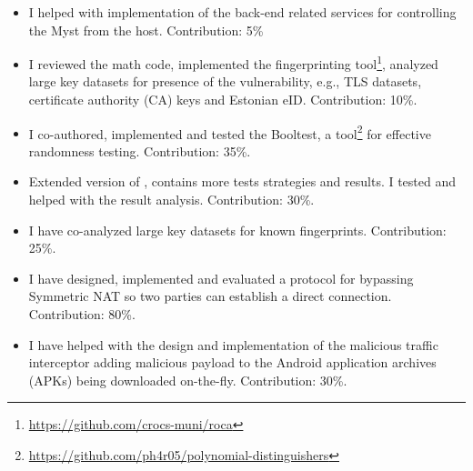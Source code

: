 \documentclass[
  digital, %
  twoside, %
  table,   %
  lof,     %
  lot,     %
]{fithesis3}
\newcounter{ph4_show_guides}
\theoremstyle{definition}
\theoremstyle{remark}
\begin{document}
\begin{itemize}
	\item {}
	I helped with implementation of the back-end related services for controlling the Myst from the host. Contribution: 5\%
	
	\item {}
	I reviewed the math code, implemented the fingerprinting tool\footnote{\url{https://github.com/crocs-muni/roca}}, analyzed large key datasets for presence of the vulnerability, e.g., TLS datasets, certificate authority (CA) keys and Estonian eID. Contribution: 10\%.
	
	\item {}
	I co-authored, implemented and tested the Booltest, a tool\footnote{\url{https://github.com/ph4r05/polynomial-distinguishers}} for effective randomness testing. Contribution: 35\%.
	
	\item {}
	Extended version of \cite{booltest_secrypt2017}, contains more tests strategies and results. I tested and helped with the result analysis. Contribution: 30\%.
	
	\item {}
	I have co-analyzed large key datasets for known fingerprints. Contribution: 25\%.
	
	\item {}
	I have designed, implemented and evaluated a protocol for bypassing Symmetric NAT so two parties can establish a direct connection. Contribution: 80\%.
	
	\item {}
	I have helped with the design and implementation of the malicious traffic interceptor adding malicious payload to the Android application archives (APKs) being downloaded on-the-fly. Contribution: 30\%.
	

\end{itemize}
\end{document}

